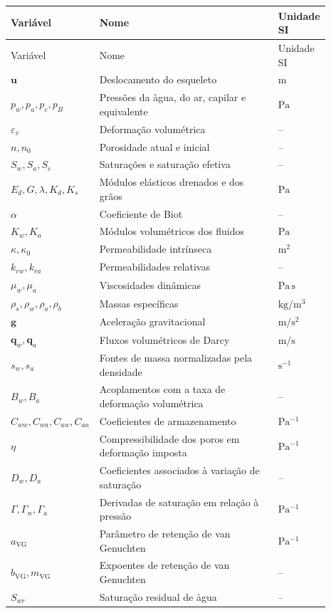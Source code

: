 \documentclass[11pt,a4paper]{article}
\begin{document}
\begin{longtable}{>{\raggedright\arraybackslash}p{0.19\linewidth}
                  >{\raggedright\arraybackslash}p{0.58\linewidth}
                  >{\raggedright\arraybackslash}p{0.12\linewidth}}
\toprule
Vari\'avel & Nome & Unidade SI\\
\midrule
\endfirsthead
\toprule
Vari\'avel & Nome & Unidade SI\\
\midrule
\endhead
$\mathbf u$ & Deslocamento do esqueleto & $\mathrm m$\\
$p_w,p_a,p_c,p_B$ & Press\~oes da \`agua, do ar, capilar e equivalente & $\mathrm{Pa}$\\
$\varepsilon_v$ & Deforma\c{c}\~ao volum\'etrica & --\\
$n,n_0$ & Porosidade atual e inicial & --\\
$S_w,S_a,S_e$ & Satura\c{c}\~oes e satura\c{c}\~ao efetiva & --\\
$E_d,G,\lambda,K_d,K_s$ & M\'odulos el\'asticos drenados e dos gr\~aos & $\mathrm{Pa}$\\
$\alpha$ & Coeficiente de Biot & --\\
$K_w,K_a$ & M\'odulos volum\'etricos dos fluidos & $\mathrm{Pa}$\\
$\kappa,\kappa_0$ & Permeabilidade intr\'inseca & $\mathrm{m^2}$\\
$k_{rw},k_{ra}$ & Permeabilidades relativas & --\\
$\mu_w,\mu_a$ & Viscosidades din\^amicas & $\mathrm{Pa\,s}$\\
$\rho_s,\rho_w,\rho_a,\rho_b$ & Massas espec\'ificas & $\mathrm{kg/m^3}$\\
$\mathbf g$ & Acelera\c{c}\~ao gravitacional & $\mathrm{m/s^2}$\\
$\mathbf q_w,\mathbf q_a$ & Fluxos volum\'etricos de Darcy & $\mathrm{m/s}$\\
$s_w,s_a$ & Fontes de massa normalizadas pela densidade & $\mathrm{s^{-1}}$\\
$B_w,B_a$ & Acoplamentos com a taxa de deforma\c{c}\~ao volum\'etrica & --\\
$C_{ww},C_{wa},C_{aw},C_{aa}$ & Coeficientes de armazenamento & $\mathrm{Pa^{-1}}$\\
$\eta$ & Compressibilidade dos poros em deforma\c{c}\~ao imposta & $\mathrm{Pa^{-1}}$\\
$D_w,D_a$ & Coeficientes associados \`a varia\c{c}\~ao de satura\c{c}\~ao & --\\
$\Gamma,\Gamma_w,\Gamma_a$ & Derivadas de satura\c{c}\~ao em rela\c{c}\~ao \`a press\~ao & $\mathrm{Pa^{-1}}$\\
$a_{\mathrm{VG}}$ & Par\^ametro de reten\c{c}\~ao de van Genuchten & $\mathrm{Pa^{-1}}$\\
$b_{\mathrm{VG}},m_{\mathrm{VG}}$ & Expoentes de reten\c{c}\~ao de van Genuchten & --\\
$S_{wr}$ & Satura\c{c}\~ao residual de \`agua & --\\
\bottomrule
\end{longtable}
\end{document}
